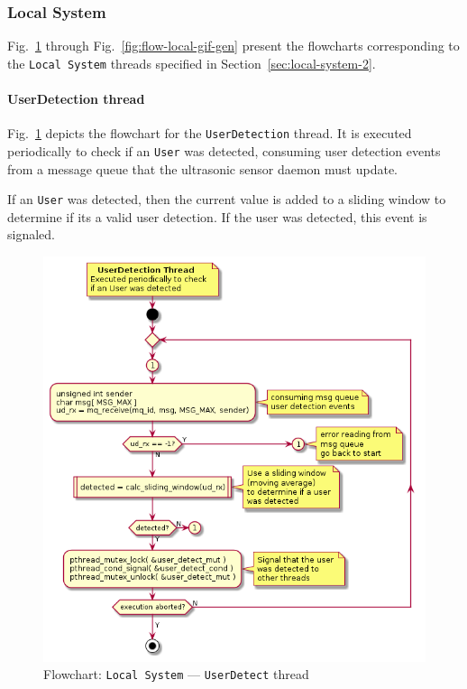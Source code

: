 \subsubsection{Local System}
\label{sec:local-system-3}
Fig.~\ref{fig:flow-local-user-detect} through Fig.~\ref{fig:flow-local-gif-gen} present the flowcharts corresponding to the \texttt{Local System}
threads specified in Section~\ref{sec:local-system-2}.

\paragraph{UserDetection thread}
Fig.~\ref{fig:flow-local-user-detect} depicts the flowchart for the
\texttt{UserDetection} thread. It is executed periodically to check if an
\texttt{User} was detected, consuming user detection events from a message
queue that the ultrasonic sensor daemon must update.

If an \texttt{User} was detected, then the current value is added to a sliding
window to determine if its a valid user detection. If the user was detected,
this event is signaled.
%
\begin{figure}[htb!]
\centering
    \includegraphics[width=0.6\columnwidth]{./img/flow-local-user-detect.png}
  \caption{Flowchart: \texttt{Local System} --- \texttt{UserDetect} thread}%
\label{fig:flow-local-user-detect}
\end{figure}
%
